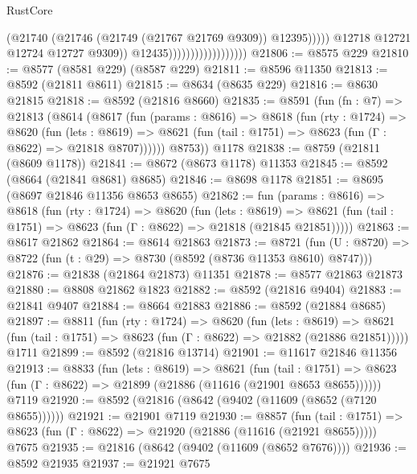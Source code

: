 \begin{lexlean}{RustCore}
\begin{coremodule}
                                                  (@21740
                                                    (@21746
                                                      (@21749 (@21767 @21769 @9309))
                                                      @12395)))))
                                            @12718
                                            @12721
                                            @12724
                                            @12727
                                            @9309))
                                        @12435))))))))))))))))))
@21806 := @8575 @229
@21810 := @8577 (@8581 @229) (@8587 @229)
@21811 := @8596 @11350
@21813 := @8592 (@21811 @8611)
@21815 := @8634 (@8635 @229)
@21816 := @8630 @21815
@21818 := @8592 (@21816 @8660)
@21835 := @8591
    (fun (fn : @7) =>
    @21813
      (@8614
        (@8617
          (fun (params : @8616) =>
          @8618
            (fun (rty : @1724) =>
            @8620
              (fun (lets : @8619) =>
              @8621 (fun (tail : @1751) => @8623 (fun (Γ : @8622) => @21818 @8707))))))
        @8753))
    @1178
@21838 := @8759 (@21811 (@8609 @1178))
@21841 := @8672 (@8673 @1178) @11353
@21845 := @8592 (@8664 (@21841 @8681) @8685)
@21846 := @8698 @1178
@21851 := @8695 (@8697 @21846 @11356 @8653 @8655)
@21862 := fun (params : @8616) =>
  @8618
    (fun (rty : @1724) =>
    @8620
      (fun (lets : @8619) =>
      @8621 (fun (tail : @1751) => @8623 (fun (Γ : @8622) => @21818 (@21845 @21851)))))
@21863 := @8617 @21862
@21864 := @8614 @21863
@21873 := @8721
    (fun (U : @8720) => @8722 (fun (t : @29) => @8730 (@8592 (@8736 @11353 @8610) @8747)))
@21876 := @21838 (@21864 @21873) @11351
@21878 := @8577 @21863 @21873
@21880 := @8808 @21862 @1823
@21882 := @8592 (@21816 @9404)
@21883 := @21841 @9407
@21884 := @8664 @21883
@21886 := @8592 (@21884 @8685)
@21897 := @8811
    (fun (rty : @1724) =>
    @8620
      (fun (lets : @8619) =>
      @8621 (fun (tail : @1751) => @8623 (fun (Γ : @8622) => @21882 (@21886 @21851)))))
    @1711
@21899 := @8592 (@21816 @13714)
@21901 := @11617 @21846 @11356
@21913 := @8833
    (fun (lets : @8619) =>
    @8621
      (fun (tail : @1751) =>
      @8623 (fun (Γ : @8622) => @21899 (@21886 (@11616 (@21901 @8653 @8655))))))
    @7119
@21920 := @8592 (@21816 (@8642 (@9402 (@11609 (@8652 (@7120 @8655))))))
@21921 := @21901 @7119
@21930 := @8857
    (fun (tail : @1751) => @8623 (fun (Γ : @8622) => @21920 (@21886 (@11616 (@21921 @8655)))))
    @7675
@21935 := @21816 (@8642 (@9402 (@11609 (@8652 @7676))))
@21936 := @8592 @21935
@21937 := @21921 @7675

\end{coremodule}
\end{lexlean}
